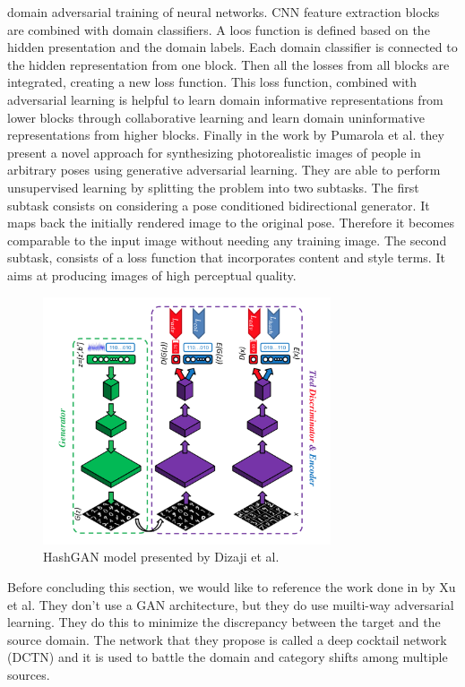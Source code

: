 \documentclass[letterpaper, 10 pt, conference]{ieeeconf}  %
\begin{document}
domain adversarial training of neural networks. CNN feature extraction blocks are combined with domain classifiers. A loos function is defined based on the hidden presentation and the domain labels. Each domain classifier is connected to the hidden representation from one block. Then all the losses from all blocks are integrated, creating a new loss function. This loss function, combined with adversarial learning is helpful to learn domain informative representations from lower blocks through collaborative learning and learn domain uninformative representations from higher blocks. Finally in the work by Pumarola et al. \cite{Pumarola_2018_CVPR} they present a novel approach for synthesizing photorealistic images of people in arbitrary poses using generative adversarial learning. They are able to perform unsupervised learning by splitting the problem into two subtasks. The first subtask consists on considering a pose conditioned bidirectional generator. It maps back the initially rendered image to the original pose. Therefore it becomes comparable to the input image without needing any training image. The second subtask, consists of a loss function that incorporates content and style terms. It aims at producing images of high perceptual quality.

\begin{figure}[h!]
\centering
\includegraphics[width=8.5cm]{hashgan.png}
\caption{HashGAN model presented by Dizaji et al.}
\label{fig:hashgan}
\end{figure}


Before concluding this section, we would like to reference the work done in \cite{Xu_2018_CVPR} by Xu et al. They don't use a GAN architecture, but they do use muilti-way adversarial learning. They do this to minimize the discrepancy between the target and the source domain. The network that they propose is called a deep cocktail network (DCTN) and it is used to battle the domain and category shifts among multiple sources.
\end{document}
